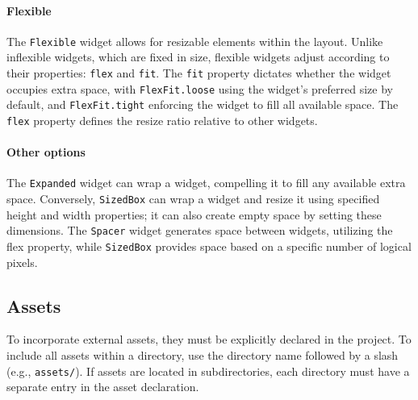 \paragraph*{Flexible}
The \texttt{Flexible} widget allows for resizable elements within the layout.
Unlike inflexible widgets, which are fixed in size, flexible widgets adjust according to their properties: \texttt{flex} and \texttt{fit}. 
The \texttt{fit} property dictates whether the widget occupies extra space, with \texttt{FlexFit.loose} using the widget's preferred size by default, and \texttt{FlexFit.tight} enforcing the widget to fill all available space. 
The \texttt{flex} property defines the resize ratio relative to other widgets.

\paragraph*{Other options}
The \texttt{Expanded} widget can wrap a widget, compelling it to fill any available extra space.
Conversely, \texttt{SizedBox} can wrap a widget and resize it using specified height and width properties; it can also create empty space by setting these dimensions. 
The \texttt{Spacer} widget generates space between widgets, utilizing the flex property, while \texttt{SizedBox} provides space based on a specific number of logical pixels.

\subsection{Assets}
To incorporate external assets, they must be explicitly declared in the project. 
To include all assets within a directory, use the directory name followed by a slash (e.g., \texttt{assets/}). 
If assets are located in subdirectories, each directory must have a separate entry in the asset declaration.